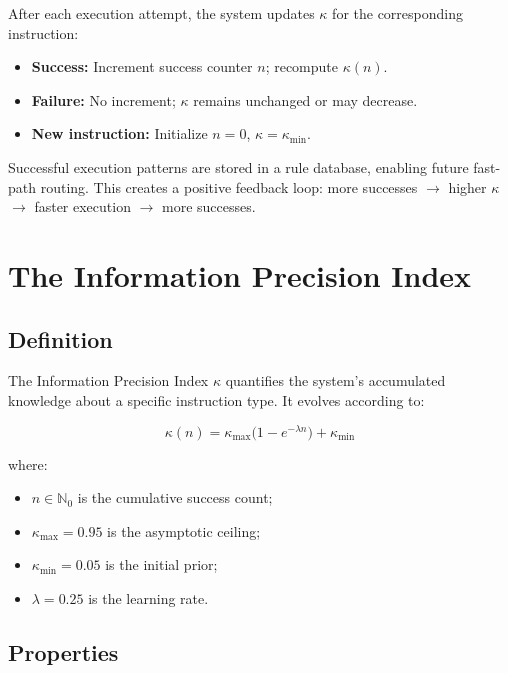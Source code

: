 \documentclass[10pt,twocolumn]{article}
\newcommand{\kap}{\kappa}
\begin{document}
After each execution attempt, the system updates $\kap$ for 
the corresponding instruction:
\begin{itemize}[leftmargin=*, itemsep=1pt]
  \item \textbf{Success:} Increment success counter $n$; 
    recompute $\kap(n)$.
  \item \textbf{Failure:} No increment; $\kap$ remains 
    unchanged or may decrease.
  \item \textbf{New instruction:} Initialize $n=0$, 
    $\kap = \kap_{\min}$.
\end{itemize}

Successful execution patterns are stored in a rule database, 
enabling future fast-path routing. This creates a positive 
feedback loop: more successes $\rightarrow$ higher $\kap$ 
$\rightarrow$ faster execution $\rightarrow$ more successes.

\section{The Information Precision Index}

\subsection{Definition}

The Information Precision Index $\kap$ quantifies the 
system's accumulated knowledge about a specific instruction 
type. It evolves according to:

\begin{equation}
  \boxed{
    \kap(n) = \kap_{\max}\bigl(1 - e^{-\lambda n}\bigr) 
    + \kap_{\min}
  }
  \label{eq:kappa}
\end{equation}

where:
\begin{itemize}[leftmargin=*, itemsep=1pt]
  \item $n \in \mathbb{N}_0$ is the cumulative success count;
  \item $\kap_{\max} = 0.95$ is the asymptotic ceiling;
  \item $\kap_{\min} = 0.05$ is the initial prior;
  \item $\lambda = 0.25$ is the learning rate.
\end{itemize}

\subsection{Properties}
\end{document}

